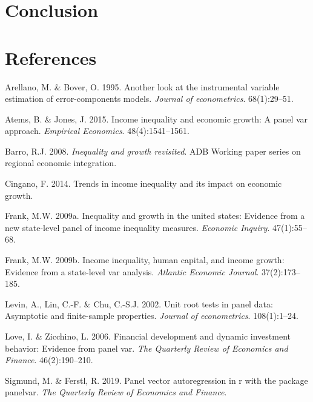 \documentclass[11pt,preprint, authoryear]{elsarticle}
\numberwithin{equation}{section}
\numberwithin{figure}{section}
\numberwithin{table}{section}
\begin{document}
\hypertarget{conclusion}{%
\section{Conclusion}\label{conclusion}}

\newpage

\hypertarget{references}{%
\section*{References}\label{references}}

\hypertarget{refs}{}
\leavevmode\hypertarget{ref-arellano}{}%
Arellano, M. \& Bover, O. 1995. Another look at the instrumental
variable estimation of error-components models. \emph{Journal of
econometrics}. 68(1):29--51.

\leavevmode\hypertarget{ref-atems}{}%
Atems, B. \& Jones, J. 2015. Income inequality and economic growth: A
panel var approach. \emph{Empirical Economics}. 48(4):1541--1561.

\leavevmode\hypertarget{ref-barro}{}%
Barro, R.J. 2008. \emph{Inequality and growth revisited}. ADB Working
paper series on regional economic integration.

\leavevmode\hypertarget{ref-cingano}{}%
Cingano, F. 2014. Trends in income inequality and its impact on economic
growth.

\leavevmode\hypertarget{ref-frank}{}%
Frank, M.W. 2009a. Inequality and growth in the united states: Evidence
from a new state-level panel of income inequality measures.
\emph{Economic Inquiry}. 47(1):55--68.

\leavevmode\hypertarget{ref-frankincome}{}%
Frank, M.W. 2009b. Income inequality, human capital, and income growth:
Evidence from a state-level var analysis. \emph{Atlantic Economic
Journal}. 37(2):173--185.

\leavevmode\hypertarget{ref-levin}{}%
Levin, A., Lin, C.-F. \& Chu, C.-S.J. 2002. Unit root tests in panel
data: Asymptotic and finite-sample properties. \emph{Journal of
econometrics}. 108(1):1--24.

\leavevmode\hypertarget{ref-love}{}%
Love, I. \& Zicchino, L. 2006. Financial development and dynamic
investment behavior: Evidence from panel var. \emph{The Quarterly Review
of Economics and Finance}. 46(2):190--210.

\leavevmode\hypertarget{ref-sigmund2019panel}{}%
Sigmund, M. \& Ferstl, R. 2019. Panel vector autoregression in r with
the package panelvar. \emph{The Quarterly Review of Economics and
Finance}.
\end{document}
